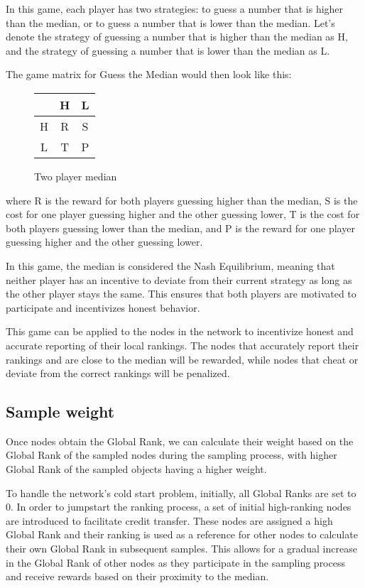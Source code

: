 \documentclass[twocolumn]{article}
\begin{document}
In this game, each player has two strategies: to guess a number that is higher than the median, or to guess a number that is lower than the median. Let's denote the strategy of guessing a number that is higher than the median as H, and the strategy of guessing a number that is lower than the median as L.

The game matrix for Guess the Median would then look like this:

\begin{figure}[htbp]
  \begin{center}
    \begin{tabular}{c|cc} & H & L \\ \hline H & R & S \\ L & T & P \\ \end{tabular}
  \end{center}

\caption{Two player median}
\end{figure}

where R is the reward for both players guessing higher than the median, S is the cost for one player guessing higher and the other guessing lower, T is the cost for both players guessing lower than the median, and P is the reward for one player guessing higher and the other guessing lower.

In this game, the median is considered the Nash Equilibrium, meaning that neither player has an incentive to deviate from their current strategy as long as the other player stays the same. This ensures that both players are motivated to participate and incentivizes honest behavior.

This game can be applied to the nodes in the network to incentivize honest and accurate reporting of their local rankings. The nodes that accurately report their rankings and are close to the median will be rewarded, while nodes that cheat or deviate from the correct rankings will be penalized.

\subsection{Sample weight}
Once nodes obtain the Global Rank, we can calculate their weight based on the Global Rank of the sampled nodes during the sampling process, with higher Global Rank of the sampled objects having a higher weight.

To handle the network's cold start problem, initially, all Global Ranks are set to 0. In order to jumpstart the ranking process, a set of initial high-ranking nodes are introduced to facilitate credit transfer. These nodes are assigned a high Global Rank and their ranking is used as a reference for other nodes to calculate their own Global Rank in subsequent samples. This allows for a gradual increase in the Global Rank of other nodes as they participate in the sampling process and receive rewards based on their proximity to the median.
\end{document}
